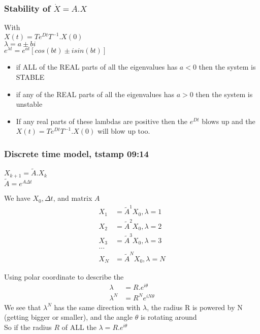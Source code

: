 \subsubsection{Stability of $\dot{X} = A.X $ }
With 
\\$X(t) = Te^{Dt}T^{-1}.X(0)$
\\$\lambda = a \pm bi$
\\$e^{\lambda t} = e^{at}[cos(bt) \pm isin(bt)]$
\begin{itemize}
  \item if ALL of the REAL parts of all the eigenvalues has $a < 0$ then the system is STABLE
  \item if any of the REAL parts of all the eigenvalues has $a > 0$ then the system is unstable
  \item If any real parts of these lambdas are positive then the $e^{Dt}$ blows up and the $X(t) = Te^{Dt}T^{-1}.X(0)$ will blow up too.
\end{itemize}

\subsubsection{Discrete time model, tstamp 09:14}
$X_{k + 1} = \tilde{A}.X_{k}$
\\$\tilde{A} = e^{A\Delta t}$

We have $X_{0}, \Delta t$, and matrix $A$
\begin{equation}
  \begin{aligned}
    X_{1}  & = {\tilde{A}}^{1}X_{0}, \lambda = 1\\
    X_{2}  & = {\tilde{A}}^{2}X_{0}, \lambda = 2\\
    X_{3}  & = {\tilde{A}}^{3}X_{0}, \lambda = 3\\
    \ldots\\
    X_{N}  & = {\tilde{A}}^{N}X_{0}, \lambda = N
  \end{aligned}  
\end{equation} 

Using polar coordinate to describe the 
\begin{equation}
  \begin{aligned}
    \lambda &= R.e^{i\theta} \\
    \lambda^{N} &= R^{N}e^{iN\theta}
  \end{aligned}
\end{equation}
We see that $\lambda^N$ has the same direction with $\lambda$,
the radius R is powered by N (getting bigger or smaller), and the angle $\theta$ is rotating around
\\So if the radius $R$ of ALL the $\lambda = R.e^{i\theta}$

